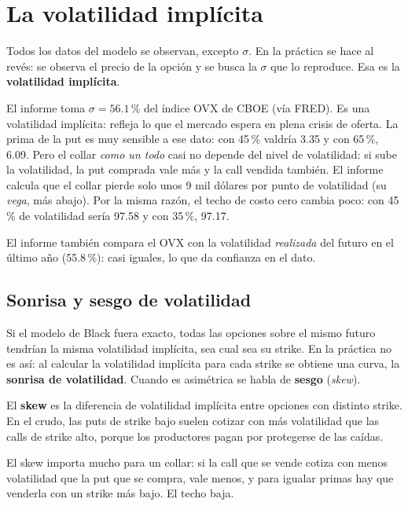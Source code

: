 \section{La volatilidad implícita}

Todos los datos del modelo se observan, excepto $\sigma$. En la práctica se hace al revés: se observa el precio de la opción y se busca la $\sigma$ que lo reproduce. Esa es la \textbf{volatilidad implícita}.

\begin{informe}
El informe toma $\sigma=56.1\,\%$ del índice OVX de CBOE (vía FRED). Es una volatilidad implícita: refleja lo que el mercado espera en plena crisis de oferta. La prima de la put es muy sensible a ese dato: con 45\,\% valdría 3.35 y con 65\,\%, 6.09. Pero el collar \emph{como un todo} casi no depende del nivel de volatilidad: si sube la volatilidad, la put comprada vale más y la call vendida también. El informe calcula que el collar pierde solo unos 9 mil dólares por punto de volatilidad (su \emph{vega}, más abajo). Por la misma razón, el techo de costo cero cambia poco: con 45\,\% de volatilidad sería 97.58 y con 35\,\%, 97.17.

El informe también compara el OVX con la volatilidad \emph{realizada} del futuro en el último año (55.8\,\%): casi iguales, lo que da confianza en el dato.
\end{informe}

\subsection{Sonrisa y sesgo de volatilidad}

Si el modelo de Black fuera exacto, todas las opciones sobre el mismo futuro tendrían la misma volatilidad implícita, sea cual sea su strike. En la práctica no es así: al calcular la volatilidad implícita para cada strike se obtiene una curva, la \textbf{sonrisa de volatilidad}. Cuando es asimétrica se habla de \textbf{sesgo} (\emph{skew}).

\begin{definicion}[Skew]
El \textbf{skew} es la diferencia de volatilidad implícita entre opciones con distinto strike. En el crudo, las puts de strike bajo suelen cotizar con más volatilidad que las calls de strike alto, porque los productores pagan por protegerse de las caídas.
\end{definicion}

El skew importa mucho para un collar: si la call que se vende cotiza con menos volatilidad que la put que se compra, vale menos, y para igualar primas hay que venderla con un strike más bajo. El techo baja.

